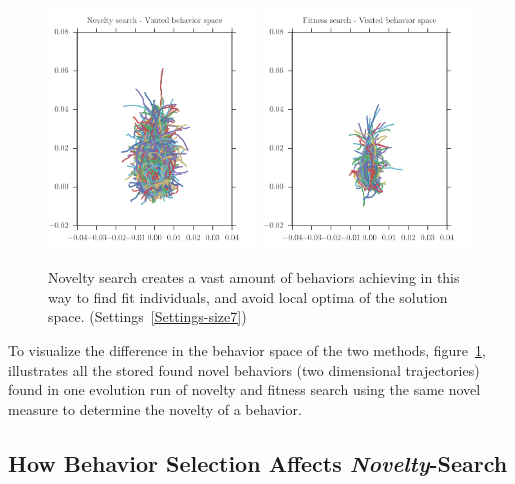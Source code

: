 \begin{figure}[t!]
\centering
\includegraphics[width=0.49\textwidth]{../Figures/Behaviors/behaviorsNovelty.pdf}\	
\includegraphics[width=0.49\textwidth]{../Figures/Behaviors/behaviorsFitness.pdf}
\caption{Novelty search creates a vast amount of behaviors achieving in this way to find fit individuals, and avoid local optima of the solution space. (Settings~\ref{Settings-size7})}
\label{fig:behaviorSpaceDiversity}
\end{figure}

To visualize the difference in the behavior space of the two methods, figure~\ref{fig:behaviorSpaceDiversity}, illustrates all the stored found novel behaviors (two dimensional trajectories) found in one evolution run of novelty and fitness search using the same novel measure to determine the novelty of a behavior.




\subsection{How Behavior Selection Affects \emph{Novelty}-Search}

